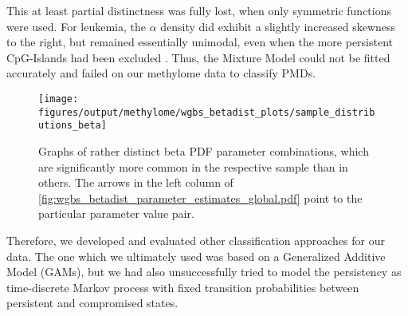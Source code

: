 This at least partial distinctness was fully lost, when only symmetric functions were used. For leukemia, the $\alpha$ density did exhibit a slightly increased skewness to the right, but remained essentially unimodal, even when the more persistent CpG-Islands had been excluded . Thus, the Mixture Model could not be fitted accurately and  failed on our methylome data to classify PMDs.

\begin{figure}[!ht]
	\centering
	\texttt{[image: figures/output/methylome/wgbs\_betadist\_plots/sample\_distributions\_beta]} 	
	\caption{Graphs of rather distinct beta PDF parameter combinations, which are significantly more common in the respective sample than in others. The arrows in the left column of \autoref{fig:wgbs_betadist_parameter_estimates_global.pdf} point to the particular parameter value pair.}
	\label{fig:wgbs_sample_distributions_beta.pdf}
\end{figure}

Therefore, we developed and evaluated other classification approaches for our data. The one which we ultimately used was based on a Generalized Additive Model (GAMs), but we had also unsuccessfully tried to model the persistency as time-discrete Markov process with fixed transition probabilities between persistent and compromised states\dns. 

